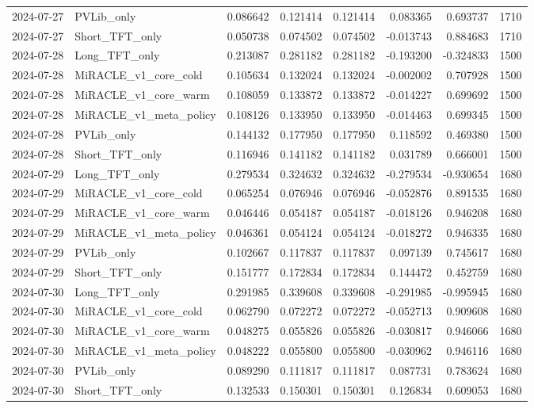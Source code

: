 \begin{tabular}{llrrrrrr}
2024-07-27 & PVLib_only & 0.086642 & 0.121414 & 0.121414 & 0.083365 & 0.693737 & 1710 \\
2024-07-27 & Short_TFT_only & 0.050738 & 0.074502 & 0.074502 & -0.013743 & 0.884683 & 1710 \\
2024-07-28 & Long_TFT_only & 0.213087 & 0.281182 & 0.281182 & -0.193200 & -0.324833 & 1500 \\
2024-07-28 & MiRACLE_v1_core_cold & 0.105634 & 0.132024 & 0.132024 & -0.002002 & 0.707928 & 1500 \\
2024-07-28 & MiRACLE_v1_core_warm & 0.108059 & 0.133872 & 0.133872 & -0.014227 & 0.699692 & 1500 \\
2024-07-28 & MiRACLE_v1_meta_policy & 0.108126 & 0.133950 & 0.133950 & -0.014463 & 0.699345 & 1500 \\
2024-07-28 & PVLib_only & 0.144132 & 0.177950 & 0.177950 & 0.118592 & 0.469380 & 1500 \\
2024-07-28 & Short_TFT_only & 0.116946 & 0.141182 & 0.141182 & 0.031789 & 0.666001 & 1500 \\
2024-07-29 & Long_TFT_only & 0.279534 & 0.324632 & 0.324632 & -0.279534 & -0.930654 & 1680 \\
2024-07-29 & MiRACLE_v1_core_cold & 0.065254 & 0.076946 & 0.076946 & -0.052876 & 0.891535 & 1680 \\
2024-07-29 & MiRACLE_v1_core_warm & 0.046446 & 0.054187 & 0.054187 & -0.018126 & 0.946208 & 1680 \\
2024-07-29 & MiRACLE_v1_meta_policy & 0.046361 & 0.054124 & 0.054124 & -0.018272 & 0.946335 & 1680 \\
2024-07-29 & PVLib_only & 0.102667 & 0.117837 & 0.117837 & 0.097139 & 0.745617 & 1680 \\
2024-07-29 & Short_TFT_only & 0.151777 & 0.172834 & 0.172834 & 0.144472 & 0.452759 & 1680 \\
2024-07-30 & Long_TFT_only & 0.291985 & 0.339608 & 0.339608 & -0.291985 & -0.995945 & 1680 \\
2024-07-30 & MiRACLE_v1_core_cold & 0.062790 & 0.072272 & 0.072272 & -0.052713 & 0.909608 & 1680 \\
2024-07-30 & MiRACLE_v1_core_warm & 0.048275 & 0.055826 & 0.055826 & -0.030817 & 0.946066 & 1680 \\
2024-07-30 & MiRACLE_v1_meta_policy & 0.048222 & 0.055800 & 0.055800 & -0.030962 & 0.946116 & 1680 \\
2024-07-30 & PVLib_only & 0.089290 & 0.111817 & 0.111817 & 0.087731 & 0.783624 & 1680 \\
2024-07-30 & Short_TFT_only & 0.132533 & 0.150301 & 0.150301 & 0.126834 & 0.609053 & 1680 \\

\end{tabular}
